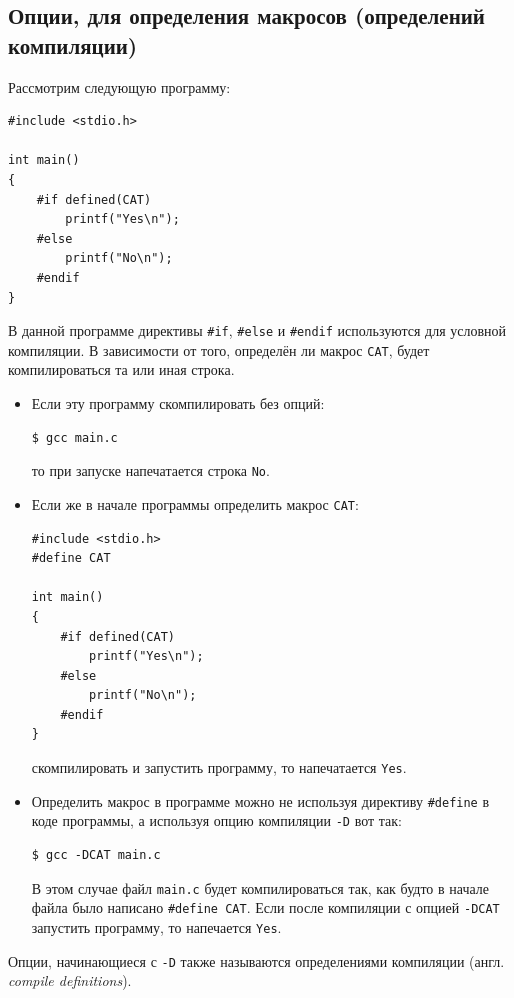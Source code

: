 \documentclass{article}
\begin{document}
\subsection*{Опции, для определения макросов (определений компиляции)}
Рассмотрим следующую программу:
\begin{lstlisting}[style=csMiptCppStyle]
#include <stdio.h>

int main()
{
    #if defined(CAT)
        printf("Yes\n");
    #else
        printf("No\n");
    #endif
}
\end{lstlisting}
В данной программе директивы \texttt{\#if}, \texttt{\#else} и \texttt{\#endif} используются для условной компиляции. В зависимости от того, определён ли макрос \texttt{CAT}, будет компилироваться та или иная строка. 
\begin{itemize}
\item Если эту программу скомпилировать без опций:
\begin{lstlisting}[style=csMiptBash]
$ gcc main.c
\end{lstlisting}
то при запуске напечатается строка \texttt{No}. 

\item Если же в начале программы определить макрос \texttt{CAT}:
\begin{lstlisting}[style=csMiptCppStyle]
#include <stdio.h>
#define CAT

int main()
{
    #if defined(CAT)
        printf("Yes\n");
    #else
        printf("No\n");
    #endif
}
\end{lstlisting}
скомпилировать и запустить программу, то напечатается \texttt{Yes}.

\item Определить макрос в программе можно не используя директиву \texttt{\#define} в коде программы, а используя опцию компиляции \texttt{-D} вот так:
\begin{lstlisting}[style=csMiptBash]
$ gcc -DCAT main.c
\end{lstlisting}
В этом случае файл \texttt{main.c} будет компилироваться так, как будто в начале файла было написано \texttt{\#define CAT}. Если после компиляции с опцией \texttt{-DCAT} запустить программу, то напечается \texttt{Yes}.
\end{itemize}

Опции, начинающиеся с \texttt{-D} также называются определениями компиляции (англ. \textit{compile definitions}). 
\end{document}
